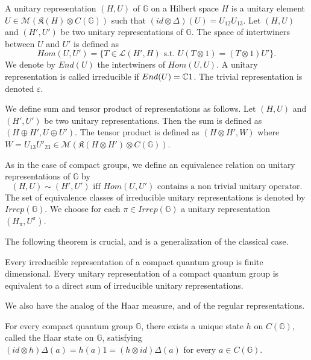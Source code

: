 \begin{definition} A unitary representation $(H,U)$ of $\mathbb G$ on a Hilbert space $H$ is a unitary element $U \in \mathcal M(\mathfrak K(H)\otimes C(\mathbb G))$ such that $(id\otimes\Delta)(U) = U_{12}U_{13}$. Let $(H,U)$ and $(H',U')$ be two unitary representations of $\mathbb G$. The space of intertwiners between $U$ and $U'$ is defined as 
\[Hom(U,U') = \{T\in \mathcal L(H',H) \text{ s.t. }U(T\otimes 1) = (T\otimes 1) U' \}.\]
We denote by $End(U)$ the intertwiners of $Hom(U,U)$. A unitary representation is called irreducible if $End(U) = \mathbb C 1$. The trivial representation is denoted $\varepsilon$.
\end{definition}

We define sum and tensor product of representations as follows. Let $(H,U)$ and $(H',U')$ be two unitary representations. Then the sum is defined as $(H\oplus H', U\oplus U')$. The tensor product is defined as $(H\otimes H',W)$ where $W = U_{13} U'_{23}\in \mathcal M(\mathfrak K(H\otimes H')\otimes C(\mathbb G))$. 

\begin{definition}
As in the case of compact groups, we define an equivalence relation on unitary representations of $\mathbb G$ by 
\[(H,U)\sim (H',U') \text{ iff } Hom(U,U') \text{ contains a non trivial unitary operator}.\]
The set of equivalence classes of irreducible unitary representations is denoted by $Irrep(\mathbb G)$. We choose for each $\pi\in Irrep (\mathbb G)$ a unitary representation $(H_\pi, U^{\pi})$. 
\end{definition}

The following theorem is crucial, and is a generalization of the classical case. 

\begin{thm} Every irreducible representation of a compact quantum group is finite dimensional. Every unitary representation of a compact quantum group is equivalent to a direct sum of irreducible unitary representations. 
\end{thm}
 
We also have the analog of the Haar measure, and of the regular representations.

\begin{prop}
For every compact quantum group $\mathbb G$, there exists a unique state $h$ on $C(\mathbb G)$, called the Haar state on $\mathbb G$, satisfying $(id\otimes h)\Delta(a) = h(a)1 = (h\otimes id)\Delta(a)$ for every $a\in C(\mathbb G)$. 
\end{prop}

